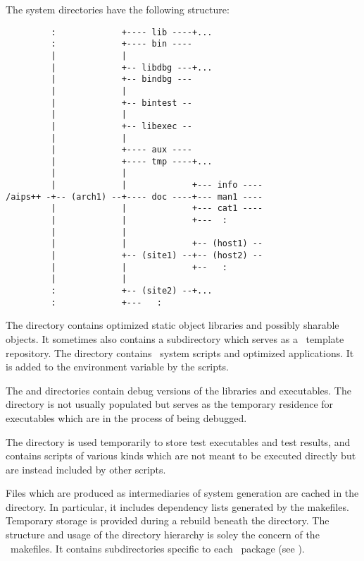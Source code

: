 The system directories have the following structure:

\begin{verbatim}
         :             +---- lib ----+...
         :             +---- bin ----
         |             |
         |             +-- libdbg ---+...
         |             +-- bindbg ---
         |             |
         |             +-- bintest --
         |             |
         |             +-- libexec --
         |             |
         |             +---- aux ----
         |             +---- tmp ----+...
         |             |
         |             |             +--- info ----
/aips++ -+-- (arch1) --+---- doc ----+--- man1 ----
         |             |             +--- cat1 ----
         |             |             +---  :
         |             |
         |             |             +-- (host1) --
         |             +-- (site1) --+-- (host2) --
         |             |             +--   :
         |             |
         :             +-- (site2) --+...
         :             +---   :
\end{verbatim}

\noindent
The  directory contains optimized static object libraries and
possibly sharable objects.  It sometimes also contains a subdirectory which
serves as a \cplusplus\ template repository.  The  directory
contains \aipspp\ system scripts and optimized applications.  It is added to
the  environment variable by the  scripts.

The  and  directories contain debug versions of the
libraries and executables.  The  directory is not usually
populated but serves as the temporary residence for executables which are in
the process of being debugged.

The  directory is used temporarily to store test executables and
test results, and  contains scripts of various kinds which are
not meant to be executed directly but are instead included by other scripts.

Files which are produced as intermediaries of system generation are cached in
the  directory.  In particular, it includes dependency lists
generated by the makefiles.  Temporary storage is provided during a rebuild
beneath the  directory.  The structure and usage of the 
directory hierarchy is soley the concern of the \aipspp\ makefiles.  It
contains subdirectories specific to each \aipspp\ package (see
).

